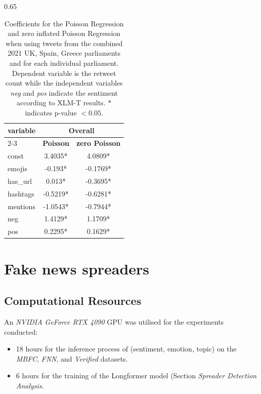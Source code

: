\begin{table}[hbp!]
\vspace{1em}

\begin{subtable}[t]{0.65\textwidth}
\centering
\begin{tabular}{|l|cc|}
\hline
\multirow{2}{*}{\textbf{variable}} & 
  \multicolumn{2}{c|}{\textbf{Overall}} \\ \cline{2-3}
 & \textbf{Poisson} & \textbf{zero Poisson} \\ \hline
const     & 3.4035* & 4.0809* \\ \hline
emojis    & -0.193* & -0.1769* \\ \hline
has\_url  & 0.013* & -0.3695* \\ \hline
hashtags  & -0.5219* & -0.6281* \\ \hline
mentions  & -1.0543* & -0.7944* \\ \hline
neg       & 1.4129* & 1.1709* \\ \hline
pos       & 0.2295* & 0.1629* \\ \hline
\end{tabular}
\end{subtable}

\caption{Coefficients for the Poisson Regression and zero inflated Poisson Regression when using tweets from the combined 2021 UK, Spain, Greece parliaments and for each individual parliament. Dependent variable is the retweet count while the independent variables \textit{neg} and \textit{pos} indicate the sentiment according to XLM-T results. $*$ indicates p-value $< 0.05$.}
\label{tab:Politics-poisson_results}
\end{table}




\section{Fake news spreaders}
\subsection{Computational Resources}
\label{sec:appendix-models}
An \textit{NVIDIA GeForce RTX 4090} GPU was utilised for the experiments conducted:
\begin{itemize}
    \item 18 hours for the inference process of (sentiment, emotion, topic) on the \textit{MBFC}, \textit{FNN}, and \textit{Verified} datasets.
    \item 6 hours for the training of the Longformer model (Section \textit{Spreader Detection Analysis}.
\end{itemize}

